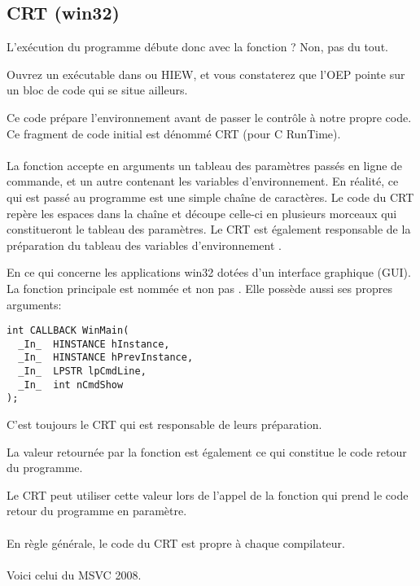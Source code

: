 ﻿\subsection{CRT (win32)}
\label{sec:CRT}

L'exécution du programme débute donc avec la fonction \main{}?
Non, pas du tout.

Ouvrez un exécutable dans \IDA ou HIEW, et vous constaterez que l'\ac{OEP} pointe sur un bloc de
code qui se situe ailleurs.

Ce code prépare l'environnement avant de passer le contrôle à notre propre code. Ce fragment de code
initial est dénommé CRT (pour C RunTime). \\
\\
La fonction \main{} accepte en arguments un tableau des paramètres passés en ligne de commande, et
un autre contenant les variables d'environnement.
En réalité, ce qui est passé au programme est une simple chaîne de caractères. Le code du CRT repère
les espaces dans la chaîne et découpe celle-ci en plusieurs morceaux qui constitueront le tableau des
paramètres.
Le CRT est également responsable de la préparation du tableau des variables d'environnement .

En ce qui concerne les applications win32 dotées d'un interface graphique (\ac{GUI}). La fonction
principale est nommée  et non pas \main{}. Elle possède aussi ses propres arguments:

\begin{lstlisting}[style=customc]
int CALLBACK WinMain(
  _In_  HINSTANCE hInstance,
  _In_  HINSTANCE hPrevInstance,
  _In_  LPSTR lpCmdLine,
  _In_  int nCmdShow
);
\end{lstlisting}

C'est toujours le CRT qui est responsable de leurs préparation.

La valeur retournée par la fonction \main{} est également ce qui constitue le code retour du
programme.

Le CRT peut utiliser cette valeur lors de l'appel de la fonction  qui prend le code
retour du programme en paramètre. \\
\\
En règle générale, le code du CRT est propre à chaque compilateur. \\
\\
Voici celui du MSVC 2008.




